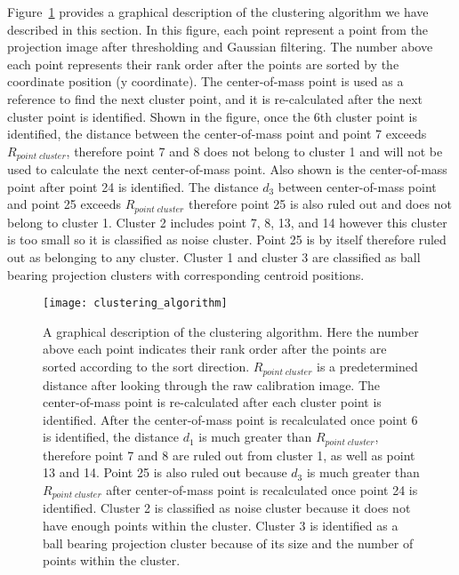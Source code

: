 Figure~\ref{fig:clustering_algorithm} provides a graphical description of the clustering algorithm we have described in this section.  In this figure, each point represent a point from the projection image after thresholding and Gaussian filtering.  The number above each point represents their rank order after the points are sorted by the coordinate position (y coordinate).  The center-of-mass point is used as a reference to find the next cluster point, and it is re-calculated after the next cluster point is identified.  Shown in the figure, once the 6th cluster point is identified, the distance between the center-of-mass point and point 7 exceeds $R_{point \; cluster}$, therefore point 7 and 8 does not belong to cluster 1 and will not be used to calculate the next center-of-mass point.  Also shown is the center-of-mass point after point 24 is identified. The distance $d_3$ between center-of-mass point and point 25 exceeds $R_{point \; cluster}$ therefore point 25 is also ruled out and does not belong to cluster 1.  Cluster 2 includes point 7, 8, 13, and 14 however this cluster is too small so it is classified as noise cluster.  Point 25 is by itself therefore ruled out as belonging to any cluster.  Cluster 1 and cluster 3 are classified as ball bearing projection clusters with corresponding centroid positions.

\begin{figure}[ht]
\centering
\texttt{[image: clustering\_algorithm]}
\caption{A graphical description of the clustering algorithm.  Here the number above each point indicates their rank order after the points are sorted according to the sort direction.  $R_{point \; cluster}$ is a predetermined distance after looking through the raw calibration image.  The center-of-mass point is re-calculated after each cluster point is identified.  After the center-of-mass point is recalculated once point 6 is identified, the distance $d_1$ is much greater than $R_{point \; cluster}$, therefore point 7 and 8 are ruled out from cluster 1, as well as point 13 and 14.  Point 25 is also ruled out because $d_3$ is much greater than $R_{point \; cluster}$ after center-of-mass point is recalculated once point 24 is identified.  Cluster 2 is classified as noise cluster because it does not have enough points within the cluster.  Cluster 3 is identified as a ball bearing projection cluster because of its size and the number of points within the cluster.}
\label{fig:clustering_algorithm}
\end{figure}



